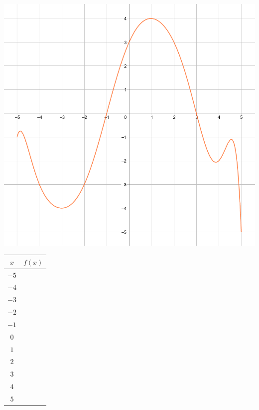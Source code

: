 \documentclass[
	classe=$1^{ere}$STI2D
]{coursclass}
\begin{document}
\begin{exemple}
	\begin{minipage}{0.67\linewidth}
		\includegraphics[width=\linewidth]{Images/graphe 1.png}
	\end{minipage}
	\begin{minipage}{0.3\linewidth}
		\begin{center}
			\renewcommand{\arraystretch}{1.2}
			\begin{tabular}{|c|c|}
				\hline $x$  & $f(x)$            \\
				\hline $-5$ & \correction{$-1$} \\
				\hline $-4$ & \correction{$-3$} \\
				\hline $-3$ & \correction{$-4$} \\
				\hline $-2$ & \correction{$-3$} \\
				\hline $-1$ & \correction{$0$}  \\
				\hline $0$  & \correction{$3$}  \\
				\hline $1$  & \correction{$4$}  \\
				\hline $2$  & \correction{$3$}  \\
				\hline $3$  & \correction{$0$}  \\
				\hline $4$  & \correction{$-2$} \\
				\hline $5$  & \correction{$-5$} \\
				\hline
			\end{tabular}


\end{center}
\end{minipage}
\end{exemple}
\end{document}
